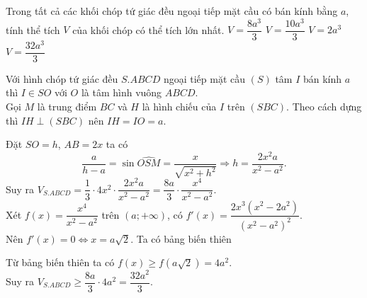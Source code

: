 \begin{ex}%
 Trong tất cả các khối chóp tứ giác đều ngoại tiếp mặt cầu có bán kính bằng $a$, tính thể tích $V$ của khối chóp có thể tích lớn nhất.
 \choice
  {$V=\dfrac{8a^3}{3}$}
  {$V=\dfrac{10a^3}{3}$}
  {$V=2a^3$}
  {\True $V=\dfrac{32a^3}{3}$}
 \loigiai
  {
  \immini
  {
  Với hình chóp tứ giác đều $S.ABCD$ ngoại tiếp mặt cầu $(S)$ tâm $I$ bán kính $a$ thì $I\in SO$ với $O$ là tâm hình vuông $ABCD$.\\
  Gọi $M$ là trung điểm $BC$ và $H$ là hình chiếu của $I$ trên $(SBC)$. Theo cách dựng thì $IH\perp (SBC)$ nên $IH=IO=a$.
  }
  {
  }
  \noindent Đặt $SO=h$, $AB=2x$ ta có
  $$ \dfrac{a}{h-a}=\sin \widehat{OSM}=\dfrac{x}{\sqrt{x^2+h^2}}\Rightarrow h=\dfrac{2x^2a}{x^2-a^2}. $$
  Suy ra $V_{S.ABCD}=\dfrac{1}{3}\cdot 4x^2\cdot \dfrac{2x^2a}{x^2-a^2}=\dfrac{8a}{3}\cdot \dfrac{x^4}{x^2-a^2}$.\\
  Xét $f(x)= \dfrac{x^4}{x^2-a^2}$ trên $(a;+\infty)$, có $f'(x)= \dfrac{2x^3(x^2-2a^2)}{\left(x^2-a^2\right)^2}$.\\
  Nên $f'(x)=0\Leftrightarrow x=a\sqrt{2}$. Ta có bảng biến thiên
  \begin{center}
  \end{center}
  Từ bảng biến thiên ta có $f(x)\ge f(a\sqrt{2})=4a^2$.\\
  Suy ra $V_{S.ABCD}\ge \dfrac{8a}{3}\cdot 4a^2= \dfrac{32a^2}{3}$.
  }
\end{ex}


